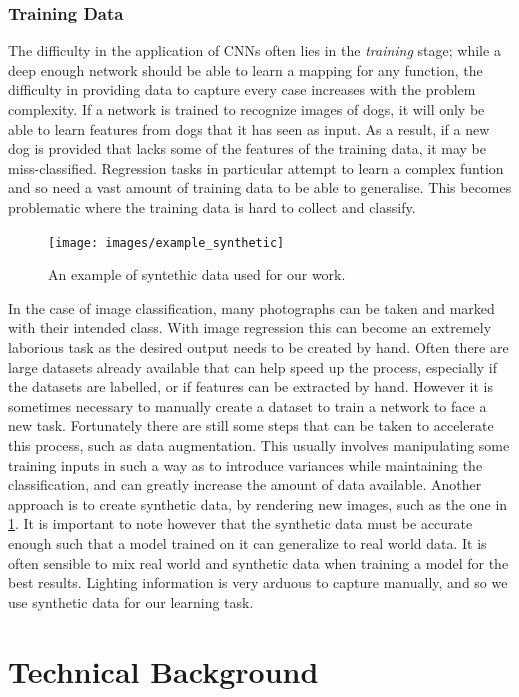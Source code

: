 \documentclass[ %
                    author={Gavin Parker},
                supervisor={Dr. Neill Campbell},
                    degree={MEng},
                     title={Deep Learning for Illumination Estimation from Stereo Images},
                  subtitle={},
                      type={Research},
                      year={2018} ]{dissertation}
\begin{document}
\subsection{Training Data}
The difficulty in the application of CNNs often lies in the \textit{training} stage; while a deep enough network should be able to learn a mapping for any function, the difficulty in providing data to capture every case increases with the problem complexity. If a network is trained to recognize images of dogs, it will only be able to learn features from dogs that it has seen as input. As a result, if a new dog is provided that lacks some of the features of the training data, it may be miss-classified. Regression tasks in particular attempt to learn a complex funtion and so need a vast amount of training data to be able to generalise. This becomes problematic where the training data is hard to collect and classify.
\begin{figure}
\texttt{[image: images/example\_synthetic]}
\centering
\caption{An example of syntethic data used for our work.}
\label{fig:synth}
\end{figure}
In the case of image classification, many photographs can be taken and marked with their intended class. With image regression this can become an extremely laborious task as the desired output needs to be created by hand. Often there are large datasets already available that can help speed up the process, especially if the datasets are labelled, or if features can be extracted by hand. However it is sometimes necessary to manually create a dataset to train a network to face a new task. Fortunately there are still some steps that can be taken to accelerate this process, such as data augmentation. This usually involves manipulating some training inputs in such a way as to introduce variances while maintaining the classification, and can greatly increase the amount of data available.
Another approach is to create synthetic data, by rendering new images, such as the one in \ref{fig:synth}. It is important to note however that the synthetic data must be accurate enough such that a model trained on it can generalize to real world data. It is often sensible to mix real world and synthetic data when training a model for the best results. Lighting information is very arduous to capture manually, and so we use synthetic data for our learning task.


\chapter{Technical Background}
\label{chap:technical}
\end{document}
